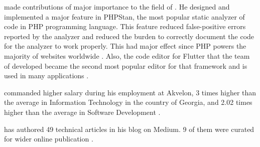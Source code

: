 \mrl made contributions of major importance to the field of \fie.
He designed and implemented a major feature in PHPStan, the most popular static analyzer
of code in PHP programming language.
This feature reduced false-positive errors reported by the analyzer
and reduced the burden to correctly document the code for the analyzer to work properly.
This had major effect since PHP powers the majority of websites worldwide .
Also, the code editor for Flutter that the team of \mrl developed
became the second most popular editor for that framework and is used in many applications
.

\mrl commanded higher salary during his employment at Akvelon,
3 times higher than the average in Information Technology in the country of Georgia,
and 2.02 times higher than the average in Software Development .

\mrl has authored 49 technical articles in his blog on Medium.
9 of them were curated for wider online publication .

\pagebreak
